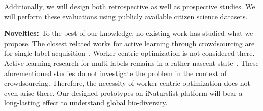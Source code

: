 Additionally, we will design both retrospective as well as prospective studies. We will perform these evaluations using publicly available citizen science datasets.


{\bf Novelties:} To the best of our knowledge, no existing work has studied what we propose. The closest  related works for active learning through crowdsourcing are for single label acquisition~\cite{active-learning-cs1, active-learning-cs2, mozafari2014scaling,corleone,clamshell}. Worker-centric optimization is not considered there. Active learning research for multi-labels 
remains in a rather nascent state~\cite{multi0,multi1,multi2,multi3}. These aforementioned studies do not investigate the problem in the context of crowdsourcing. Therefore, the necessity of worker-centric optimization does not even arise there. Our designed prototypes on iNaturslist platform will bear a long-lasting effect to understand global bio-diversity.

















\vspace{-0.1in}
